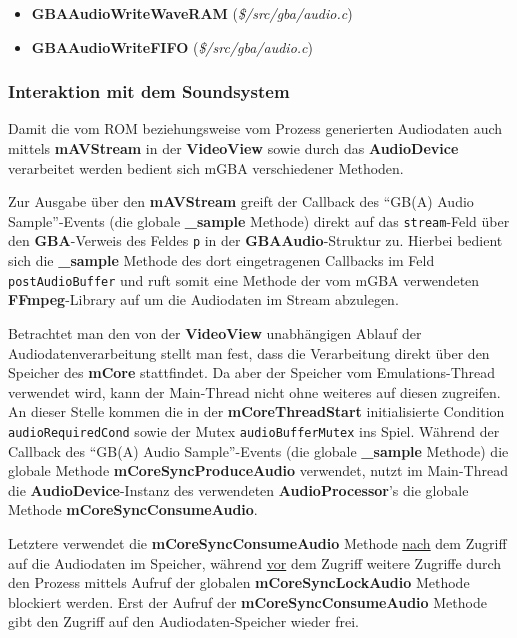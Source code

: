 \documentclass[11pt,a4paper]{scrartcl}
\begin{document}
\begin{itemize}
    \item \textbf{GBAAudioWriteWaveRAM} (\textit{\$/src/gba/audio.c})
    \item \textbf{GBAAudioWriteFIFO} (\textit{\$/src/gba/audio.c})
\end{itemize}


\newpage


\subsubsection{Interaktion mit dem Soundsystem}

Damit die vom ROM beziehungsweise vom Prozess generierten Audiodaten auch mittels \textbf{mAVStream} in der \textbf{VideoView} sowie durch das \textbf{AudioDevice} verarbeitet werden bedient sich mGBA verschiedener Methoden.

Zur Ausgabe \"uber den \textbf{mAVStream} greift der Callback des \enquote{GB(A) Audio Sample}-Events (die globale \textbf{{\_}sample} Methode) direkt auf das \verb|stream|-Feld \"uber den \textbf{GBA}-Verweis des Feldes \verb|p| in der \textbf{GBAAudio}-Struktur zu. Hierbei bedient sich die \textbf{{\_}sample} Methode des dort eingetragenen Callbacks im Feld \verb|postAudioBuffer| und ruft somit eine Methode der vom mGBA verwendeten \textbf{FFmpeg}-Library auf um die Audiodaten im Stream abzulegen.

Betrachtet man den von der \textbf{VideoView} unabh\"angigen Ablauf der Audiodatenverarbeitung stellt man fest, dass die Verarbeitung direkt \"uber den Speicher des \textbf{mCore} stattfindet. Da aber der Speicher vom Emulations-Thread verwendet wird, kann der Main-Thread nicht ohne weiteres auf diesen zugreifen. An dieser Stelle kommen die in der \textbf{mCoreThreadStart} initialisierte Condition \verb|audioRequiredCond| sowie der Mutex \verb|audioBufferMutex| ins Spiel. W\"ahrend der Callback des \enquote{GB(A) Audio Sample}-Events (die globale \textbf{{\_}sample} Methode) die globale Methode \textbf{mCoreSyncProduceAudio} verwendet, nutzt im Main-Thread die \textbf{AudioDevice}-Instanz des verwendeten \textbf{AudioProcessor}'s die globale Methode \textbf{mCoreSyncConsumeAudio}.

Letztere verwendet die \textbf{mCoreSyncConsumeAudio} Methode \underline{nach} dem Zugriff auf die Audiodaten im Speicher, w\"ahrend \underline{vor} dem Zugriff weitere Zugriffe durch den Prozess mittels Aufruf der globalen \textbf{mCoreSyncLockAudio} Methode blockiert werden. Erst der Aufruf der \textbf{mCoreSyncConsumeAudio} Methode gibt den Zugriff auf den Audiodaten-Speicher wieder frei.
\end{document}
